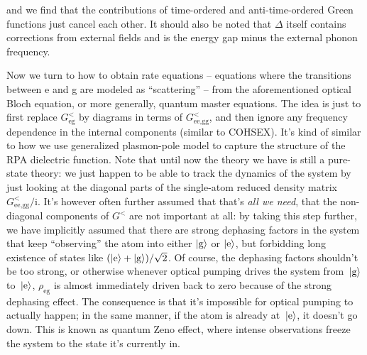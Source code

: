 \documentclass[hyperref, a4paper]{article}
\newcommand*{\ii}{\mathrm{i}}
\newcommand*{\kete}{\ket*{\text{e}}}
\newcommand*{\ketg}{\ket*{\text{g}}}
\begin{document}
and we find that the contributions of time-ordered and anti-time-ordered Green functions
just cancel each other.
It should also be noted that $\Delta$ itself contains corrections from external fields
and is the energy gap minus the external phonon frequency.

Now we turn to how to obtain rate equations -- 
equations where the transitions between e and g are modeled as ``scattering'' -- 
from the aforementioned optical Bloch equation, 
or more generally, quantum master equations.
The idea is just to first replace $G^<_{\text{eg}}$ by diagrams in terms of $G^<_{\text{ee}, \text{gg}}$,
and then ignore any frequency dependence in the internal components
(similar to COHSEX).
It's kind of similar to how we use generalized plasmon-pole model to capture the structure of the RPA dielectric function.
Note that until now the theory we have is still a pure-state theory:
we just happen to be able to track the dynamics of the system 
by just looking at the diagonal parts of the single-atom reduced density matrix $G^<_{\text{ee,gg}} / \ii$.
It's however often further assumed that that's \emph{all we need},
that the non-diagonal components of $G^<$ are not important at all:
by taking this step further, we have implicitly assumed that there are strong dephasing factors in the system
that keep ``observing'' the atom into either $\ket{\text{g}}$ or $\ket{\text{e}}$,
but forbidding long existence of states like $(\ket{\text{e}} + \ket{\text{g}}) / \sqrt{2}$.
Of course, the dephasing factors shouldn't be too strong,
or otherwise whenever optical pumping drives the system from $\ketg$ to $\kete$, 
$\rho_{\text{eg}}$ is almost immediately driven back to zero
because of the strong dephasing effect.
The consequence is that it's impossible for optical pumping to actually happen;
in the same manner, if the atom is already at $\kete$, it doesn't go down.
This is known as quantum Zeno effect,
where intense observations freeze the system to the state it's currently in.
\end{document}
